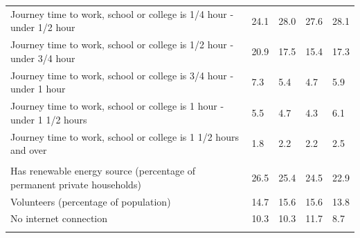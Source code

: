 \documentclass{article}
\begin{document}
\begin{table}[h]
\begin{tabular}{KTTTT}
Journey time to work, school or college is 1/4 hour - under 1/2 hour & 24.1& 28.0& 27.6& 28.1\\
Journey time to work, school or college is 1/2 hour - under 3/4 hour & 20.9& 17.5& 15.4& 17.3\\
Journey time to work, school or college is 3/4 hour - under 1 hour & 7.3& 5.4& 4.7& 5.9\\
Journey time to work, school or college is 1 hour - under 1 1/2 hours & 5.5& 4.7& 4.3& 6.1\\
Journey time to work, school or college is 1 1/2 hours and over & 1.8& 2.2& 2.2& 2.5\\
\hline
    \\ 
    \hline
Has renewable energy source (percentage of permanent private households) & 26.5& 25.4& 24.5& 22.9\\
    \hline
Volunteers (percentage of population) & 14.7& 15.6& 15.6& 13.8\\
    \hline
No internet connection& 10.3& 10.3& 11.7&  8.7\\
\hline
\end{tabular}
\end{table}
\end{document}
